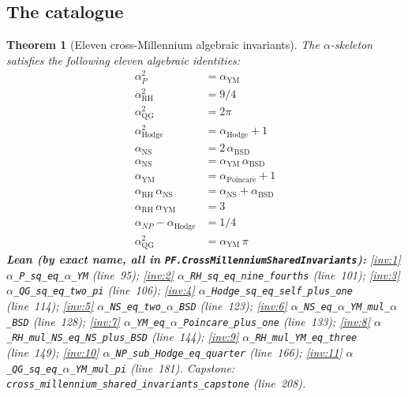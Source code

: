 \documentclass[11pt,a4paper]{article}
\theoremstyle{plain}
\newtheorem{theorem}{Theorem}[section]
\theoremstyle{definition}
\begin{document}
\subsection{The catalogue}
\label{sec:catalogue}

\begin{theorem}[Eleven cross-Millennium algebraic invariants]
\label{thm:eleven-invariants}
The $\alpha$-skeleton satisfies the following eleven algebraic
identities:
\begin{align}
\alpha_{P}^{2} &= \alpha_{\mathrm{YM}}
  \label{inv:1} \\
\alpha_{\mathrm{RH}}^{2} &= 9/4
  \label{inv:2} \\
\alpha_{\mathrm{QG}}^{2} &= 2\pi
  \label{inv:3} \\
\alpha_{\mathrm{Hodge}}^{2} &= \alpha_{\mathrm{Hodge}} + 1
  \label{inv:4} \\
\alpha_{\mathrm{NS}} &= 2\, \alpha_{\mathrm{BSD}}
  \label{inv:5} \\
\alpha_{\mathrm{NS}} &= \alpha_{\mathrm{YM}}\, \alpha_{\mathrm{BSD}}
  \label{inv:6} \\
\alpha_{\mathrm{YM}} &= \alpha_{\mathrm{Poincar\acute e}} + 1
  \label{inv:7} \\
\alpha_{\mathrm{RH}}\, \alpha_{\mathrm{NS}} &=
  \alpha_{\mathrm{NS}} + \alpha_{\mathrm{BSD}}
  \label{inv:8} \\
\alpha_{\mathrm{RH}}\, \alpha_{\mathrm{YM}} &= 3
  \label{inv:9} \\
\alpha_{NP} - \alpha_{\mathrm{Hodge}} &= 1/4
  \label{inv:10} \\
\alpha_{\mathrm{QG}}^{2} &= \alpha_{\mathrm{YM}}\, \pi
  \label{inv:11}
\end{align}
\textbf{Lean (by exact name, all in
\texttt{PF.CrossMillenniumSharedInvariants}):}
\eqref{inv:1} \texttt{$\alpha$\_P\_sq\_eq\_$\alpha$\_YM} (line~95);
\eqref{inv:2} \texttt{$\alpha$\_RH\_sq\_eq\_nine\_fourths} (line~101);
\eqref{inv:3} \texttt{$\alpha$\_QG\_sq\_eq\_two\_pi} (line~106);
\eqref{inv:4} \texttt{$\alpha$\_Hodge\_sq\_eq\_self\_plus\_one}
  (line~114);
\eqref{inv:5} \texttt{$\alpha$\_NS\_eq\_two\_$\alpha$\_BSD} (line~123);
\eqref{inv:6} \texttt{$\alpha$\_NS\_eq\_$\alpha$\_YM\_mul\_$\alpha$\_BSD}
  (line~128);
\eqref{inv:7} \texttt{$\alpha$\_YM\_eq\_$\alpha$\_Poincare\_plus\_one}
  (line~133);
\eqref{inv:8} \texttt{$\alpha$\_RH\_mul\_NS\_eq\_NS\_plus\_BSD}
  (line~144);
\eqref{inv:9} \texttt{$\alpha$\_RH\_mul\_YM\_eq\_three} (line~149);
\eqref{inv:10} \texttt{$\alpha$\_NP\_sub\_Hodge\_eq\_quarter}
  (line~166);
\eqref{inv:11} \texttt{$\alpha$\_QG\_sq\_eq\_$\alpha$\_YM\_mul\_pi}
  (line~181).
Capstone: \texttt{cross\_millennium\_shared\_invariants\_capstone}
  (line~208).
\end{theorem}
\end{document}
